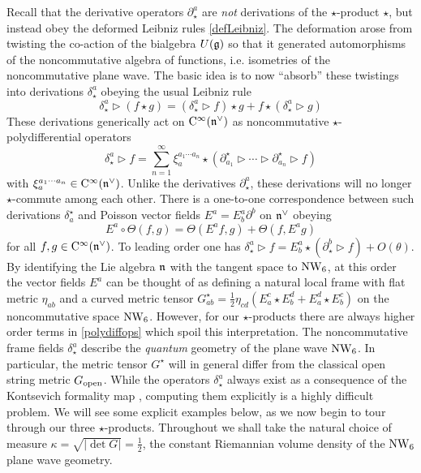 Recall that the derivative operators $\partial_\star^{a}$ are {\it not}
derivations of the $\star$-product $\star$, but instead obey the deformed Leibniz
rules \eqref{defLeibniz}. The deformation arose from twisting the co-action of
the bialgebra $U({\mathfrak g})$ so that it generated automorphisms of the noncommutative
algebra of functions, i.e. isometries of the noncommutative plane wave. The
basic idea is to now ``absorb'' these twistings into derivations
$\delta_\star^a$ obeying the usual Leibniz rule
\begin{equation}
  \label{deltaLeibniz}
  \delta_\star^a\triangleright(f\star g)=\left(\delta_\star^a
    \triangleright f\right)\star g+f\star\left(\delta_\star^a
    \triangleright g\right)
\end{equation}
These derivations generically act on ${\rm C}^\infty({\mathfrak n}^\vee)$ as noncommutative
$\star$-polydifferential operators
\begin{equation}
  \label{polydiffops}
  \delta_\star^a\triangleright f=\sum_{n=1}^\infty \xi_a^{a_1\cdots
    a_n}\star\left(\partial_{a_1}^\star\triangleright\cdots\triangleright
    \partial_{a_n}^\star \triangleright f\right)
\end{equation}
with $\xi_a^{a_1\cdots a_n}\in{\rm C}^\infty({\mathfrak n}^\vee)$. Unlike the derivatives
$\partial_\star^a$, these derivations will no longer $\star$-commute among each
other. There is a one-to-one correspondence \cite{Kont1} between such
derivations $\delta_a^\star$ and Poisson vector fields $E^a=E^a_b \partial^b$ on
${\mathfrak n}^\vee$ obeying
\begin{equation}
  \label{Poissonvecfields}
  E^a\circ\Theta(f,g)=\Theta(E^af,g)+\Theta(f,E^ag)
\end{equation}
for all $f,g\in{\rm C}^\infty({\mathfrak n}^\vee)$. To leading order one has
$\delta_\star^a\triangleright f=E^a_b\star(\partial_\star^b\triangleright
f)+O(\theta)$. By identifying the Lie algebra ${\mathfrak n}$ with the tangent space to
$\operatorname{NW}_6$, at this order the vector fields $E^a$ can be thought of as defining a
natural local frame with flat metric $\eta_{ab}$ and a curved metric tensor
$G^\star_{ab}=\frac12 \eta_{cd} (E^c_a\star E^d_b+E^d_a\star E^c_b)$ on the
noncommutative space $\operatorname{NW}_6$. However, for our $\star$-products there are always
higher order terms in \eqref{polydiffops} which spoil this interpretation. The
noncommutative frame fields $\delta_\star^a$ describe the {\it quantum} geometry
of the plane wave $\operatorname{NW}_6$. In particular, the metric tensor $G^\star$ will in
general differ from the classical open string metric $G_{\rm open}$. While the
operators $\delta_\star^a$ always exist as a consequence of the Kontsevich
formality map \cite{Kont1,BehrSyk1}, computing them explicitly is a highly
difficult problem. We will see some explicit examples below, as we now begin to
tour through our three $\star$-products. Throughout we shall take the natural
choice of measure $\kappa=\sqrt{|\det G|}=\frac12$, the constant Riemannian
volume density of the $\operatorname{NW}_6$ plane wave geometry.

